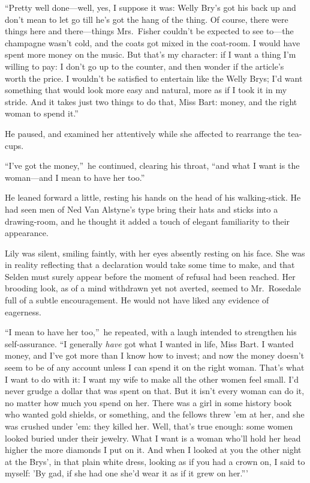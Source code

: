 \documentclass[12pt,a4paper]{book}
\begin{document}
``Pretty well done---well, yes, I suppose it was: Welly Bry's got
his back up and don't mean to let go till he's got the hang of
the thing. Of course, there were things here and there---things
Mrs.\ Fisher couldn't be expected to see to---the champagne wasn't
cold, and the coats got mixed in the coat-room. I would have
spent more money on the music. But that's my character: if I want
a thing I'm willing to pay: I don't go up to the counter, and
then wonder if the article's worth the price. I wouldn't be
satisfied to entertain like the Welly Brys; I'd want something
that would look more easy and natural, more as if I took it in my
stride. And it takes just two things to do that, Miss
Bart: money, and the right woman to spend it.''





He paused, and examined her attentively while she affected to
rearrange the tea-cups.





``I've got the money,''\ he continued, clearing his throat, ``and
what I want is the woman---and I mean to have her too.''





He leaned forward a little, resting his hands on the head of his
walking-stick. He had seen men of Ned Van Alstyne's type bring
their hats and sticks into a drawing-room, and he thought it
added a touch of elegant familiarity to their appearance.





Lily was silent, smiling faintly, with her eyes absently resting
on his face. She was in reality reflecting that a declaration
would take some time to make, and that Selden must surely appear
before the moment of refusal had been reached. Her brooding look,
as of a mind withdrawn yet not averted, seemed to Mr.\ Rosedale
full of a subtle encouragement. He would not have liked any
evidence of eagerness.





``I mean to have her too,''\ he repeated, with a laugh intended to
strengthen his self-assurance. ``I generally \textit{have} got what I
wanted in life, Miss Bart. I wanted money, and I've got more than
I know how to invest; and now the money doesn't seem to be of any
account unless I can spend it on the right woman. That's what I
want to do with it: I want my wife to make all the other women
feel small. I'd never grudge a dollar that was spent on that. But
it isn't every woman can do it, no matter how much you spend on
her. There was a girl in some history book who wanted gold
shields, or something, and the fellows threw 'em at her, and she
was crushed under 'em: they killed her. Well, that's true enough: 
some women looked buried under their jewelry. What I want is a
woman who'll hold her head higher the more diamonds I put on it. 
And when I looked at you the other night at the Brys', in that
plain white dress, looking as if you had a crown on, I said to
myself: 'By gad, if she had one she'd wear it as if it grew on
her.'''
\end{document}
